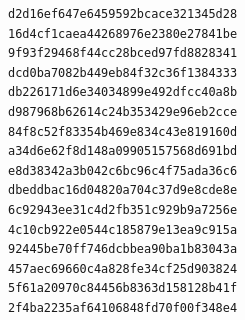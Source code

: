 \documentclass[12pt,a4paper]{article}
\begin{document}
\begin{lstlisting}
d2d16ef647e6459592bcace321345d28
16d4cf1caea44268976e2380e27841be
9f93f29468f44cc28bced97fd8828341
dcd0ba7082b449eb84f32c36f1384333
db226171d6e34034899e492dfcc40a8b
d987968b62614c24b353429e96eb2cce
84f8c52f83354b469e834c43e819160d
a34d6e62f8d148a09905157568d691bd
e8d38342a3b042c6bc96c4f75ada36c6
dbeddbac16d04820a704c37d9e8cde8e
6c92943ee31c4d2fb351c929b9a7256e
4c10cb922e0544c185879e13ea9c915a
92445be70ff746dcbbea90ba1b83043a
457aec69660c4a828fe34cf25d903824
5f61a20970c84456b8363d158128b41f
2f4ba2235af64106848fd70f00f348e4
\end{lstlisting}
\end{document}
